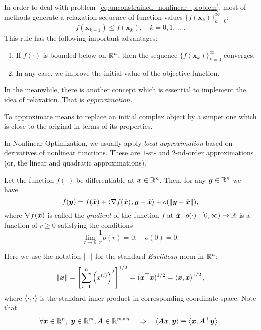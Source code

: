 In order to deal with problem~\ref{eq:unconstrained_nonlinear_problem}, most of methods generate a relaxation sequence of function values \(\{ f(\bm{x}_k) \}_{k=0}^{\infty}\):
\[
    f(\bm{x}_{k+1}) \le f(\bm{x}_k), \quad k = 0, 1, \dots ~.  
\]
This rule has the following important advantages:
\begin{enumerate}
    \item If \(f(\cdot)\) is bounded below on \(\mathbb{R}^n\), then the sequence \(\{ f(\bm{x}_k) \}_{k=0}^{\infty}\) converges.
    \item In any case, we improve the initial value of the objective function.
\end{enumerate}

In the meanwhile, there is another concept which is essential to implement the idea of relaxation. That is \emph{approximation}.
\begin{defn}[Approximation]\label{defn:approx}
    To approximate means to replace an initial complex object by a simper one which is close to the original in terms of its properties.
\end{defn}

In Nonlinear Optimization, we usually apply \emph{local approximation} based on derivatives of nonlinear functions. These are \(1\)-st- and \(2\)-nd-order approximations (or, the linear and quadratic approximations).

\begin{defn}\label{defn:linear_approx}
    Let the function \(f(\cdot)\) be differentiable at \(\bar{\bm{x}} \in \mathbb{R}^n\). Then, for any \(\bm{y} \in \mathbb{R}^n\) we have
    \[
        f(\bm{y}) = f(\bar{\bm{x}}) + \left\langle \nabla f(\bar{\bm{x}}), \bm{y} - \bar{\bm{x}} \right\rangle + o(\norm{\bm{y} - \bar{\bm{x}}}),
    \]
    where \(\nabla f(\bar{\bm{x}})\) is called the \emph{gradient} of the function \(f\) at \(\bar{\bm{x}}\). \(o(\cdot): [0, \infty) \to \mathbb{R}\) is a function of \(r \ge 0\) satisfying the conditions
    \[
        \lim_{r\to0} \frac{1}{r} o(r) = 0, \quad o(0) = 0. 
    \]
\end{defn}

Here we use the notation \(\norm{\cdot}\) for the standard \emph{Euclidean} norm in \(\mathbb{R}^n\):
\[
    \norm{\bm{x}} = \left[ \sum_{i=1}^n \left( x^{(i)} \right)^2 \right]^{1/2} = (\bm{x}^\top \bm{x})^{1/2} = \left\langle \bm{x}, \bm{x} \right\rangle^{1/2},
\]
where \(\left\langle \cdot, \cdot \right\rangle\) is the standard inner product in corresponding coordinate space. Note that
\[
    \forall \bm{x} \in \mathbb{R}^n,~\bm{y} \in \mathbb{R}^m, \bm{A} \in \mathbb{R}^{m \times n} \quad \Rightarrow \quad \left\langle \bm{A}\bm{x}, \bm{y} \right\rangle \equiv \left\langle \bm{x}, \bm{A}^\top\bm{y} \right\rangle,
\] 

